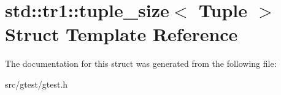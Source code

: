 \hypertarget{structstd_1_1tr1_1_1tuple__size}{}\section{std\+:\+:tr1\+:\+:tuple\+\_\+size$<$ Tuple $>$ Struct Template Reference}
\label{structstd_1_1tr1_1_1tuple__size}


The documentation for this struct was generated from the following file\+:\begin{DoxyCompactItemize}
\item 
src/gtest/gtest.\+h\end{DoxyCompactItemize}
